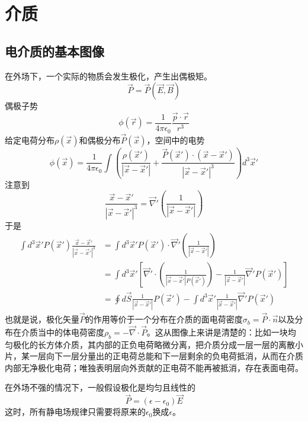 \documentclass[a4paper,11pt]{ctexbook}
\newcommand{\beq}{\begin{equation}}
\newcommand{\eeq}{\end{equation}}
\newcommand{\bea}{\begin{equation}\begin{aligned}}
\newcommand{\eea}{\end{aligned}\end{equation}}
\newcommand{\del}{\vec{\nabla}}
\newcommand{\epv}{\epsilon_0}
\begin{document}
\section{介质}
\subsection{电介质的基本图像}
在外场下，一个实际的物质会发生极化，产生出偶极矩。
\beq
\vec{P} = \vec P ( \vec E,\vec B)
\eeq
偶极子势
\beq
\phi(\vec r) = \frac{1}{4\pi \epv} \frac{\vec p \cdot \vec r}{r^3}
\eeq
给定电荷分布$\rho(\vec x)$和偶极分布$\vec P (\vec x)$，空间中的电势
\beq
\phi(\vec x) =  \frac{1}{4\pi \epv}  \int \left(\frac{\rho(\vec{x}')}{|\vec x - \vec{x}'|} + \frac{\vec P(\vec{x}') \cdot (\vec{x} - \vec{x}')}{|\vec x - \vec{x}'|^3} \right) d^3 \vec{x}'
\eeq
注意到
\beq
\frac{\vec x  - \vec{x}'}{|\vec x - \vec{x}'|^3} = \del' \left( \frac{1}{|\vec x - \vec{x}'|}\right)
\eeq
于是
\bea
\int d^3 \vec{x}' P(\vec{x}') \frac{\vec x  - \vec{x}'}{|\vec x - \vec{x}'|^3} &= \int d^3 \vec{x}' P(\vec{x}')\cdot \del' \left( \frac{1}{|\vec x - \vec{x}'|}\right) \\
&= \int d^3 \vec{x}' \left[ \del' \cdot \left( \frac{1}{|\vec x - \vec{x}'|P(\vec{x}')}\right)  - \frac{1}{|\vec x - \vec{x}'|} \del' P(\vec{x}')\right]\\
&=\oint d\vec S \frac{1}{|\vec x - \vec{x}'|}P(\vec{x}')- \int d^3 \vec{x}' \frac{1}{|\vec x - \vec{x}'|} \del' P(\vec{x}')
\eea
也就是说，极化矢量$\vec P$的作用等价于一个分布在介质的面电荷密度$\sigma_b = \vec P \cdot \vec n$以及分布在介质当中的体电荷密度$\rho_b = -\del \cdot \vec P$。这从图像上来讲是清楚的：比如一块均匀极化的长方体介质，其内部的正负电荷略微分离，把介质分成一层一层的离散小片，某一层向下一层分量出的正电荷总能和下一层剩余的负电荷抵消，从而在介质内部无净极化电荷；唯独表明层向外贡献的正电荷不能再被抵消，存在表面电荷。
\par
在外场不强的情况下，一般假设极化是均匀且线性的
\beq
\vec P = (\epsilon - \epv) \vec E
\eeq
这时，所有静电场规律只需要将原来的$\epv$换成$\epsilon$。
\end{document}
